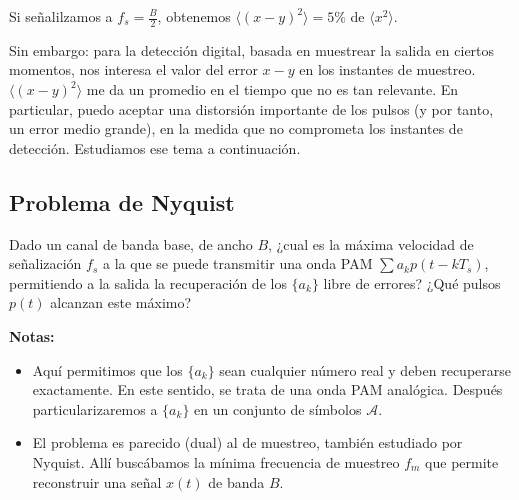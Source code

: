 \begin{ejemplo} \mbox{}%
\begin{center}\begin{minipage}{\textwidth}
    \endpgfgraphicnamed\end{minipage}
\end{center}
Si señalilzamos a $f_s = \frac{B}{2}$, obtenemos
$\langle(x-y)^2\rangle = 5\%$ de $ \langle x^2\rangle$.
\end{ejemplo}

Sin embargo: para la detección digital, basada en muestrear la
salida en ciertos momentos, nos interesa el valor del error $x-y$
en los instantes de
   muestreo.  $\langle(x-y)^2\rangle$ me da un promedio en el tiempo que no es tan relevante. En
   particular, puedo aceptar una distorsión importante de los
   pulsos (y por tanto, un error medio grande), en la medida que no
   comprometa los instantes de detección. Estudiamos ese tema a continuación.

\subsection*{Problema de Nyquist}

Dado un canal de banda base, de ancho $B$, ¿cual es la máxima
velocidad de señalización $f_s$  a la que se puede transmitir una
onda PAM $\sum a_k p(t-kT_s)$,  permitiendo a la salida la
recuperación de los $\{a_k\}$ libre de errores? ¿Qué pulsos $p(t)$
alcanzan este máximo?

{\bf Notas:}
\begin{itemize}
        \item Aquí permitimos que los $\{a_k\}$ sean cualquier número real y deben recuperarse exactamente. En este sentido, se trata de una onda PAM analógica.
        Después particularizaremos a $\{a_k\}$ en un conjunto de símbolos $\mathcal{A}$.
        \item El problema es parecido (dual) al de muestreo, también estudiado por Nyquist. Allí buscábamos la mínima frecuencia de muestreo $f_m$ que permite reconstruir una señal $x(t)$ de banda $B$.
    \end{itemize}

